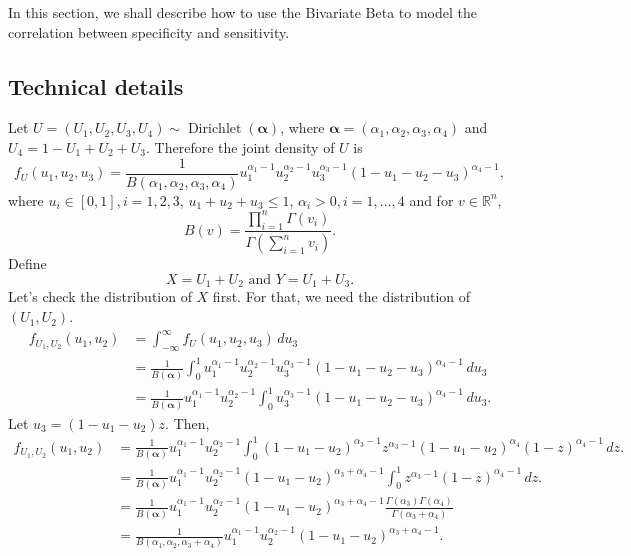 \documentclass[a4paper, notitlepage, 11pt]{article}
\newcommand{\R}{\mathbb{R}}
\theoremstyle{definition}
\theoremstyle{remark}
\begin{document}
In this section, we shall describe how to use the Bivariate Beta
\cite[]{olkin2015constructions} to model the correlation between specificity
and sensitivity.

\subsection{Technical details}

Let $U = (U_1, U_2, U_3, U_4) \sim
\operatorname{Dirichlet}(\boldsymbol{\alpha})$, where $\boldsymbol{\alpha} =
(\alpha_1, \alpha_2, \alpha_3, \alpha_4)$ and $U_4 = 1 - U_1 + U_2 + U_3$.
Therefore the joint density of $U$ is 
\begin{equation}
  f_U(u_1, u_2, u_3) = \frac{1}{B(\alpha_1,\alpha_2,\alpha_3,\alpha_4)}u_1^{\alpha_1-1}u_2^{\alpha_2-1}u_3^{\alpha_3-1}(1-u_1-u_2-u_3)^{\alpha_4-1}, 
\end{equation}
where $u_i \in [0,1], i = 1,2,3$, $u_1 + u_2 + u_3 \le 1$, $\alpha_i > 0, i =
1,...,4$ and for $v \in \R^n$,
$$B(v) = \frac{\prod_{i=1}^n \Gamma(v_i)}{\Gamma\left(\sum_{i=1}^n v_i\right)}.$$ 
Define
\begin{equation}
  X = U_1 + U_2 \text{ and } Y = U_1 + U_3.
\end{equation} 
Let's check the distribution of $X$ first. For that, we need the distribution
of $(U_1, U_2)$. 
\begin{equation}
  \label{eq:dist-u1-u2}
  \begin{split}
    f_{U_1, U_2}(u_1, u_2) &= \int_{-\infty}^{\infty} f_{U}(u_1,u_2,u_3) \, du_3 \\ 
    &= \frac{1}{B(\boldsymbol{\alpha})}\int_0^1 u_1^{\alpha_1-1}u_2^{\alpha_2-1}u_3^{\alpha_3-1}(1-u_1-u_2-u_3)^{\alpha_4-1} \, du_3 \\
    &= \frac{1}{B(\boldsymbol{\alpha})}u_1^{\alpha_1-1}u_2^{\alpha_2-1}\int_0^1 u_3^{\alpha_3-1}(1-u_1-u_2-u_3)^{\alpha_4-1} \, du_3.
  \end{split}
\end{equation}
Let $u_3 = (1 - u_1 - u_2)z$. Then,
\begin{equation}
  \begin{split}
    f_{U_1, U_2}(u_1, u_2) &= \frac{1}{B(\boldsymbol{\alpha})}u_1^{\alpha_1-1}u_2^{\alpha_2-1}\int_0^1 (1-u_1-u_2)^{\alpha_3-1}z^{\alpha_3-1}(1-u_1-u_2)^{\alpha_4}(1-z)^{\alpha_4-1} \, dz. \\
    &= \frac{1}{B(\boldsymbol{\alpha})}u_1^{\alpha_1-1}u_2^{\alpha_2-1}(1-u_1-u_2)^{\alpha_3+\alpha_4-1}\int_0^1 z^{\alpha_3-1}(1-z)^{\alpha_4-1} \, dz. \\
    &= \frac{1}{B(\boldsymbol{\alpha})}u_1^{\alpha_1-1}u_2^{\alpha_2-1}(1-u_1-u_2)^{\alpha_3+\alpha_4-1}\frac{\Gamma(\alpha_3)\Gamma(\alpha_4)}{\Gamma(\alpha_3 + \alpha_4)} \\
    &= \frac{1}{B(\alpha_1, \alpha_2, \alpha_3+\alpha_4)}u_1^{\alpha_1-1}u_2^{\alpha_2-1}(1-u_1-u_2)^{\alpha_3+\alpha_4-1}.
  \end{split}
\end{equation}
\end{document}
